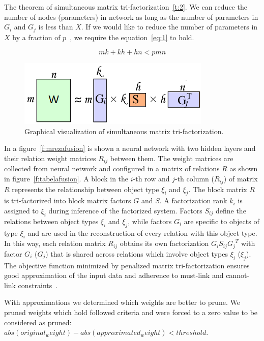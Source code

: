 \documentclass{article} %
\begin{document}
The theorem of simultaneous matrix tri-factorization~\ref{t:2}. We can reduce the number of nodes (parameters) in network as long as the number of parameters in $G_i$ and $G_j$ is less than $X$. If we would like to reduce the number of parameters in $X$ by a fraction of $p$~\cite{sainath2013low}, we require the equation~\ref{eq:1} to hold.

\begin{equation} \label{eq:1}
 mk + kh + hn < pmn
\end{equation}


\begin{figure}[!ht]
\centering 
\includegraphics[width=.5\textwidth]{mf2.png}
\caption{Graphical visualization of simultaneous matrix tri-factorization.}
\label{f:mf2}
\end{figure}


\newpage

In a figure~\ref{f:mrezafusion} is shown a neural network with two hidden layers 
and their relation weight matrices $R_{ij}$ between them. The weight matrices are collected 
from neural network and configured in a matrix of relations $R$ as shown in 
figure~\ref{f:tabelafusion}. A block in the $i$-th row and $j$-th column ($R_{ij}$) of matrix $R$ represents the relationship between object type $\xi_i$ and $\xi_j$. The block matrix $R$ is tri-factorized into block matrix factors $G$ and $S$. A factorization rank $k_i$ is assigned to $\xi_i$ during inference of the factorized system. Factors $S_{ij}$ define the relations between object types $\xi_i$ and $\xi_j$, while factors $G_i$ are specific to objects of type $\xi_i$ and are used in the reconstruction of every relation with  this object type. In this way, each relation matrix $R_{ij}$ obtains its own factorization $G_i S_{ij} {G_j}^T$ with factor $G_i$ ($G_j$) that is shared across relations which involve object types $\xi_i$ ($\xi_j$). The objective function minimized by penalized matrix
tri-factorization ensures good approximation of the input
data and adherence to must-link and cannot-link
constraints~\cite{zitnik2015data}.

With approximations we determined which weights are better to prune.
We pruned weights which hold followed criteria and were forced to a zero value to be considered as pruned:
$abs(original_weight) - abs(approximated_weight) < threshold.$
\end{document}
